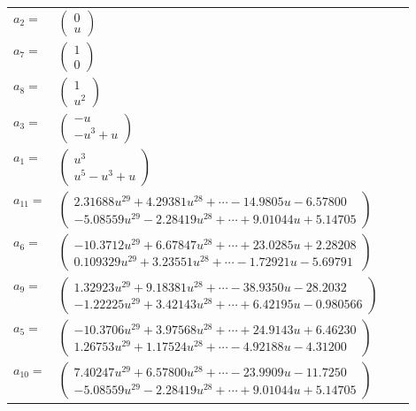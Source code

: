 \documentclass[1p]{elsarticle_modified}
\theoremstyle{definition}
\begin{document}
\begin{tabular}{m{7pt} m{180pt} m{7pt} m{180pt} }
\flushright $a_{2}=$&$\begin{pmatrix}0\\u\end{pmatrix}$ \\
\flushright $a_{7}=$&$\begin{pmatrix}1\\0\end{pmatrix}$ \\
\flushright $a_{8}=$&$\begin{pmatrix}1\\u^2\end{pmatrix}$ \\
\flushright $a_{3}=$&$\begin{pmatrix}- u\\- u^3+u\end{pmatrix}$ \\
\flushright $a_{1}=$&$\begin{pmatrix}u^3\\u^5- u^3+u\end{pmatrix}$ \\
\flushright $a_{11}=$&$\begin{pmatrix}2.31688 u^{29}+4.29381 u^{28}+\cdots-14.9805 u-6.57800\\-5.08559 u^{29}-2.28419 u^{28}+\cdots+9.01044 u+5.14705\end{pmatrix}$ \\
\flushright $a_{6}=$&$\begin{pmatrix}-10.3712 u^{29}+6.67847 u^{28}+\cdots+23.0285 u+2.28208\\0.109329 u^{29}+3.23551 u^{28}+\cdots-1.72921 u-5.69791\end{pmatrix}$ \\
\flushright $a_{9}=$&$\begin{pmatrix}1.32923 u^{29}+9.18381 u^{28}+\cdots-38.9350 u-28.2032\\-1.22225 u^{29}+3.42143 u^{28}+\cdots+6.42195 u-0.980566\end{pmatrix}$ \\
\flushright $a_{5}=$&$\begin{pmatrix}-10.3706 u^{29}+3.97568 u^{28}+\cdots+24.9143 u+6.46230\\1.26753 u^{29}+1.17524 u^{28}+\cdots-4.92188 u-4.31200\end{pmatrix}$ \\
\flushright $a_{10}=$&$\begin{pmatrix}7.40247 u^{29}+6.57800 u^{28}+\cdots-23.9909 u-11.7250\\-5.08559 u^{29}-2.28419 u^{28}+\cdots+9.01044 u+5.14705\end{pmatrix}$ \\

\end{tabular}
\end{document}
